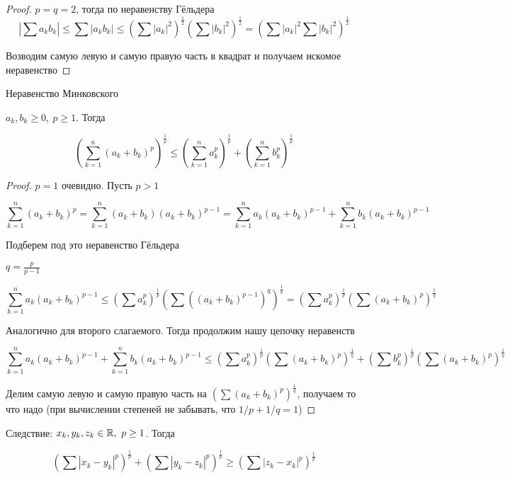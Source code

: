 \begin{proof}
    $p = q = 2$, тогда по неравенству Гёльдера
    \[ |\sum a_kb_k| \leq \sum|a_kb_k| \leq \left(\sum|a_k|^2\right)^\frac{1}{2} \left(\sum|b_k|^2\right)^\frac{1}{2} =
    \left(\sum|a_k|^2 \sum|b_k|^2\right)^\frac{1}{2}\]

    Возводим самую левую и самую правую часть в квадрат и получаем искомое неравенство
\end{proof} 

\begin{theorem}
    Неравенство Минковского

    $a_k, b_k \geq 0,\ p \geq 1$. Тогда

    \[ \left(\sum_{k=1}^{n}(a_k+b_k)^p\right)^\frac{1}{p} \leq \left(\sum_{k=1}^{n} a_k^p\right)^\frac{1}{p} +
    \left(\sum_{k=1}^{n} b_k^p\right)^\frac{1}{p} \]
\end{theorem}

\begin{proof}
    $p = 1$ очевидно. Пусть $p > 1$

    \[ \sum_{k=1}^{n}(a_k+b_k)^p = \sum_{k=1}^{n}(a_k+b_k)(a_k+b_k)^{p-1} =
    \sum_{k=1}^{n} a_k(a_k+b_k)^{p-1} + \sum_{k=1}^{n} b_k(a_k+b_k)^{p-1} \]

    Подберем под это неравенство Гёльдера

    $q = \frac{p}{p-1}$

    \[ \sum_{k=1}^{n} a_k(a_k+b_k)^{p-1} \leq \left( \sum a_k^p \right)^\frac{1}{p} \left( \sum ((a_k+b_k)^{p-1})^q \right)^\frac{1}{q}
    = \left( \sum a_k^p \right)^\frac{1}{p} \left( \sum (a_k+b_k)^p \right)^\frac{1}{q} \] 

    Аналогично для второго слагаемого. Тогда продолжим нашу цепочку неравенств

    \[ \sum_{k=1}^{n} a_k(a_k+b_k)^{p-1} + \sum_{k=1}^{n} b_k(a_k+b_k)^{p-1} \leq
    \left( \sum a_k^p \right)^\frac{1}{p} \left( \sum (a_k+b_k)^p \right)^\frac{1}{q} + \left( \sum b_k^p \right)^\frac{1}{p} \left( \sum (a_k+b_k)^p \right)^\frac{1}{q} \]

    Делим самую левую и самую правую часть на $\left( \sum (a_k+b_k)^p \right)^\frac{1}{q}$, 
    получаем то что надо (при вычислении степеней не забывать, что $1/p + 1/q = 1$)


\end{proof}

\begin{theorem}
    Следствие: $x_k, y_k, z_k \in \mathbb{R},\ p \geq 1$. Тогда

    \[ \left( \sum |x_k-y_k|^p \right)^\frac{1}{p} + \left( \sum |y_k-z_k|^p \right)^\frac{1}{p} \geq
    \left( \sum |z_k-x_k|^p \right)^\frac{1}{p} \]
    
\end{theorem}

